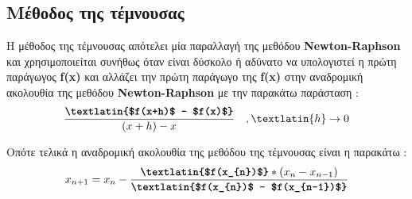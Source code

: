 \documentclass[First Project.tex]{subfiles}
\begin{document}
\subsection{ Μέθοδος της τέμνουσας }
Η μέθοδος της τέμνουσας απότελει μία παραλλαγή της μεθόδου \textlatin{\textbf{Newton-Raphson}} και χρησιμοποιείται συνήθως όταν είναι 
δύσκολο ή αδύνατο να υπολογιστεί η πρώτη παράγωγος \textlatin{\textbf{f(x)}} και αλλάζει την πρώτη παράγωγο της \textlatin{\textbf{f(x)}} στην
αναδρομική ακολουθία της μεθόδου \textlatin{\textbf{Newton-Raphson}} με την παρακάτω παράσταση :
\begin{equation*}
    \frac{\textbf{\textlatin{$f(x+h)$ - $f(x)$}}}{(x+h) - x} \quad, \textlatin{h}  \rightarrow 0
\end{equation*}

Οπότε τελικά η αναδρομική ακολουθία της μεθόδου της τέμνουσας είναι η παρακάτω :
\begin{equation*}
    x_{n+1} = x_{n} - \frac{\textbf{\textlatin{$f(x_{n})$}} * ( x_{n} - x_{n-1})} { \textbf{\textlatin{$f(x_{n})$ - $f(x_{n-1})$}} }
\end{equation*}
\end{document}
